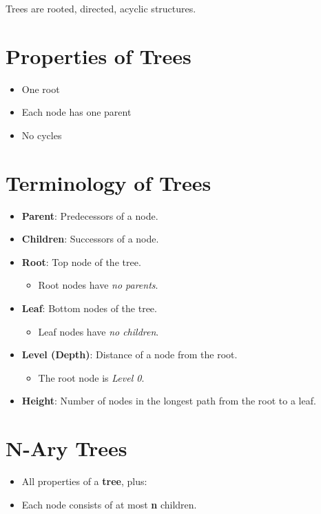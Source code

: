 \documentclass[12pt, letterpaper]{article}
\begin{document}
Trees are rooted, directed, acyclic structures.

\section*{Properties of Trees}

\begin{itemize}
    \item One root
    \item Each node has one parent
    \item No cycles
\end{itemize}

\section*{Terminology of Trees}

\begin{itemize}
    \item \textbf{Parent}: Predecessors of a node.
    \item \textbf{Children}: Successors of a node.
    \item \textbf{Root}: Top node of the tree.
        \begin{itemize}
            \item Root nodes have \textit{no parents}.
        \end{itemize}
    \item \textbf{Leaf}: Bottom nodes of the tree.
        \begin{itemize}
            \item Leaf nodes have \textit{no children}.
        \end{itemize}
    \item \textbf{Level (Depth)}: Distance of a node from the root.
        \begin{itemize}
            \item The root node is \textit{Level 0}.
        \end{itemize}
    \item \textbf{Height}: Number of nodes in the longest path from the root to a leaf.
\end{itemize}

\section*{N-Ary Trees}
\begin{itemize}
    \item All properties of a \textbf{tree}, plus:
    \item Each node consists of at most \textbf{n} children.
\end{itemize}
\end{document}

